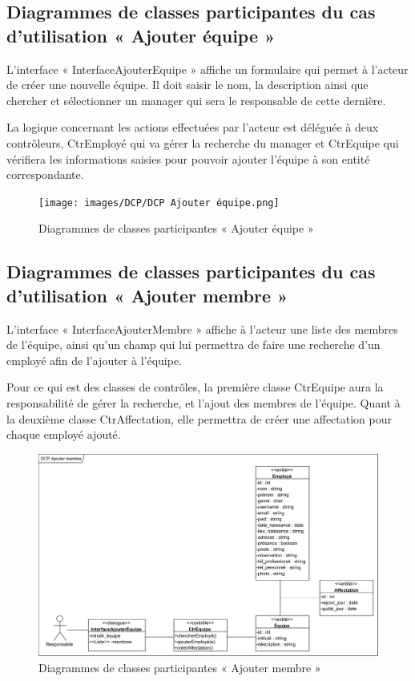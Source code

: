 \subsection*{Diagrammes de classes participantes du cas d'utilisation « Ajouter équipe »}
L’interface « InterfaceAjouterEquipe » affiche un formulaire qui permet à
l’acteur de créer une nouvelle équipe. Il doit saisir le nom, la description
ainsi que chercher et sélectionner un manager qui sera le responsable de cette
dernière.
        
La logique concernant les actions effectuées par l’acteur est déléguée à 
deux contrôleurs, CtrEmployé qui va gérer la recherche du manager et CtrEquipe
qui vérifiera les informations saisies pour pouvoir ajouter l’équipe à son 
entité correspondante.
       
\clearpage
            
\begin{figure}[h!]
    \centering
    \texttt{[image: images/DCP/DCP Ajouter équipe.png]}
    \caption{Diagrammes de classes participantes « Ajouter équipe »}
    \label{fig29}
\end{figure}
            
\subsection*{Diagrammes de classes participantes du cas d'utilisation « Ajouter membre »}
L’interface « InterfaceAjouterMembre » affiche à l’acteur une liste des membres 
de l’équipe, ainsi qu’un champ qui lui permettra de faire une recherche d’un 
employé afin de l’ajouter à l’équipe.
        
Pour ce qui est des classes de contrôles, la première classe CtrEquipe aura la 
responsabilité de gérer la recherche, et l’ajout des membres de l’équipe. Quant
à la deuxième classe CtrAffectation, elle permettra de créer une affectation pour 
chaque employé ajouté.
       
\clearpage
            
\begin{figure}[h!]
	\centering
    \includegraphics[scale=0.72]{images/DCP/DCP Ajouter membre.png}
    \caption{Diagrammes de classes participantes « Ajouter membre »}
    \label{fig30}
\end{figure}
            
